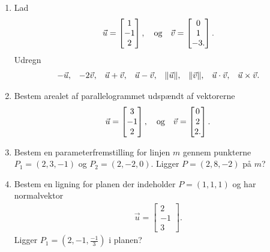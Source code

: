\begin{enumerate}
	
	\item  Lad 
	\begin{align*}
	\vec{u}=\begin{bmatrix}
	1\\-1\\2
	\end{bmatrix},\quad \textup{og}\quad \vec{v}=\begin{bmatrix}
	0\\1\\-3.
	\end{bmatrix}.
	\end{align*}
	Udregn
	\begin{align*}
	-\vec{u},&&-2\vec{v},&&\vec{u}+\vec{v},&&\vec{u}-\vec{v},&&\Vert \vec{u}\Vert,&&\Vert \vec{v}\Vert,&&\vec{u}\cdot \vec{v},&& \vec{u}\times \vec{v}.
	\end{align*}
	
	\item Bestem arealet af parallelogrammet udspændt af vektorerne
	\begin{align*}
	\vec{u}=\begin{bmatrix}
	3\\-1\\2
	\end{bmatrix},\quad \textup{og}\quad \vec{v}=\begin{bmatrix}
	0\\2\\2.
	\end{bmatrix}.
	\end{align*}
	
	\item Bestem en parameterfremstilling for linjen $m$ gennem punkterne $P_1 =
	(2, 3,-1)$ og $P_2 = (2,-2, 0)$. Ligger $P = (2, 8, -2)$ på $m$?
	
	\item Bestem en ligning for planen der indeholder $P=(1,1,1)$ og har normalvektor
	\begin{align*}
	\vec{u}=\begin{bmatrix}
	2\\-1\\3
	\end{bmatrix}.
	\end{align*}
	Ligger $P_1=(2,-1,\frac{-1}{3})$ i planen?
\end{enumerate}